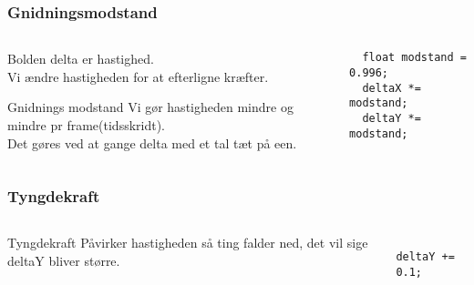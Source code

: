 \documentclass{beamer}
\begin{document}
\begin{frame}[fragile]
  \frametitle{Gnidningsmodstand}

  \begin{columns}
    \begin{column}{0.5\textwidth}
      \begin{block}{Bolden}
        delta er hastighed. \\

        Vi ændre hastigheden for at efterligne kræfter.
      \end{block}


      \begin{block}{Gnidnings modstand}
        Vi gør hastigheden mindre og mindre pr frame(tidsskridt).\\
        Det gøres ved at gange delta med et tal tæt på een.
      \end{block}

    \end{column}
    \begin{column}{0.5\textwidth}
\begin{verbatim} 
  float modstand = 0.996;
  deltaX *= modstand;
  deltaY *= modstand;
\end{verbatim}
    \end{column}
  \end{columns}
\end{frame}

\begin{frame}[fragile]
  \frametitle{Tyngdekraft}
  
  \begin{columns}
    \begin{column}{0.5\textwidth}
      
      \begin{block}{Tyngdekraft}
        Påvirker hastigheden så ting falder ned, det vil sige deltaY bliver større.
      \end{block}
      
    \end{column}
    \begin{column}{0.5\textwidth}
\begin{verbatim} 

deltaY += 0.1;

\end{verbatim}
    \end{column}
  \end{columns}
\end{frame}
\end{document}
